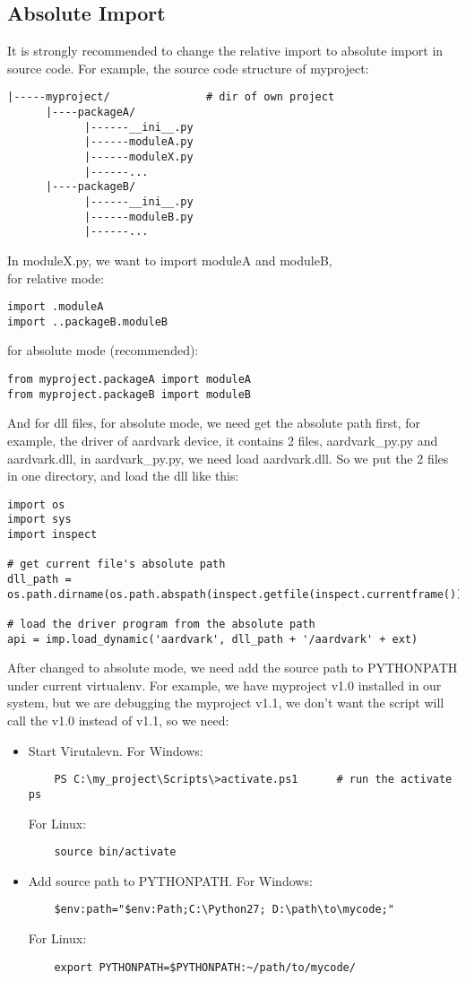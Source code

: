 \documentclass{article}
\begin{document}
\subsection{Absolute Import}
It is strongly recommended to change the relative import to absolute import in source code.
For example, the source code structure of myproject:
\begin{lstlisting}
|-----myproject/               # dir of own project 
      |----packageA/
            |------__ini__.py
            |------moduleA.py
            |------moduleX.py
            |------...
      |----packageB/
            |------__ini__.py
            |------moduleB.py
            |------...
\end{lstlisting}
In moduleX.py, we want to import moduleA and moduleB, \\
for relative mode: 
\begin{lstlisting}
import .moduleA
import ..packageB.moduleB
\end{lstlisting}
for absolute mode (recommended):
\begin{lstlisting}
from myproject.packageA import moduleA
from myproject.packageB import moduleB
\end{lstlisting}
And for dll files, for absolute mode, we need get the absolute path first, for example, the driver of aardvark device, 
it contains 2 files, aardvark\_py.py and aardvark.dll, in aardvark\_py.py, we need load aardvark.dll. So we put the 2 files in one directory, and load the dll like this:
\begin{lstlisting}
import os
import sys
import inspect

# get current file's absolute path
dll_path = os.path.dirname(os.path.abspath(inspect.getfile(inspect.currentframe())))

# load the driver program from the absolute path
api = imp.load_dynamic('aardvark', dll_path + '/aardvark' + ext)
\end{lstlisting}
After changed to absolute mode, we need add the source path to PYTHONPATH under current virtualenv. For example, we have myproject v1.0 installed in our system, 
but we are debugging the myproject v1.1, we don't want the script will call the v1.0 instead of v1.1, so we need:
\begin{itemize}
    \item
    Start Virutalevn.
    For Windows:
    \begin{lstlisting}
    PS C:\my_project\Scripts\>activate.ps1      # run the activate ps
    \end{lstlisting}
    For Linux:
    \begin{lstlisting}
    source bin/activate
    \end{lstlisting}
    \item
    Add source path to PYTHONPATH.
    For Windows:
    \begin{lstlisting}
    $env:path="$env:Path;C:\Python27; D:\path\to\mycode;"
    \end{lstlisting}
    For Linux:
    \begin{lstlisting}
    export PYTHONPATH=$PYTHONPATH:~/path/to/mycode/
    \end{lstlisting}
\end{itemize}
\end{document}
